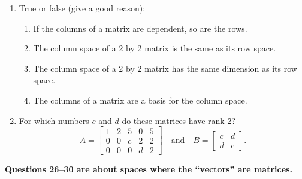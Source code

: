 \documentclass[14pt, a4paper]{article}
\begin{document}
\begin{enumerate}[resume]
    \item True or false (give a good reason):
          \begin{enumerate}
              \item If the columns of a matrix are dependent, so are the rows.
              \item The column space of a 2 by 2 matrix is the same as its row space.
              \item The column space of a 2 by 2 matrix has the same dimension as its row space.
              \item The columns of a matrix are a basis for the column space.
          \end{enumerate}

    \item For which numbers $c$ and $d$ do these matrices have rank 2?
          \[
              A = \begin{bmatrix} 1 & 2 & 5 & 0 & 5 \\ 0 & 0 & c & 2 & 2 \\ 0 & 0 & 0 & d & 2 \end{bmatrix} \quad \text{and} \quad
              B = \begin{bmatrix} c & d \\ d & c \end{bmatrix}.
          \]
\end{enumerate}

\noindent \textbf{Questions 26--30 are about spaces where the ``vectors'' are matrices.}
\end{document}
